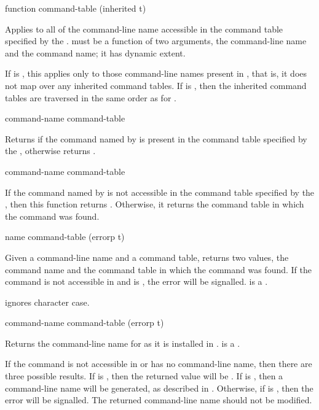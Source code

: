  {function command-table \key (inherited t)}

Applies  to all of the command-line name accessible in the
command table specified by the 
.   must be a function of two arguments,
the command-line name and the command name; it has dynamic extent.

If  is , this applies  only to
those command-line names present in , that is, it does
not map over any inherited command tables.  If  is
, then the inherited command tables are traversed in the same
order as for .


 {command-name command-table}

Returns  if the command named by  is present in
the command table specified by the 
, otherwise returns .

 {command-name command-table}

If the command named by  is not accessible in the command
table specified by the  , then
this function returns .  Otherwise, it returns the command table in
which the command was found.


 {name command-table \key (errorp t)}

Given a command-line name  and a command table, returns two values,
the command name and the command table in which the command was found.  If the
command is not accessible in  and  is
, the  error will be signalled.
 is a .

 ignores character case.

 {command-name command-table \key (errorp t)}

Returns the command-line name for  as it is installed in
.   is a .

If the command is not accessible in  or has no command-line
name, then there are three possible results.  If  is , then
the returned value will be .  If  is , then a
command-line name will be generated, as described in
.  Otherwise, if  is , then
the  error will be signalled.  The returned
command-line name should not be modified.


